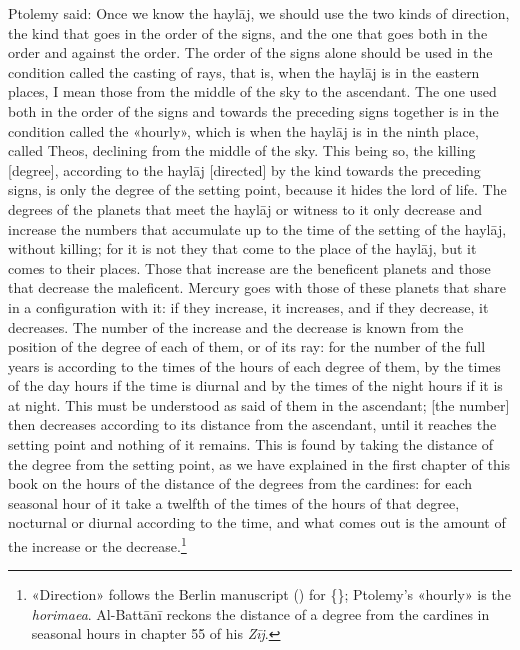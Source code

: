 \documentclass[11pt]{article}
\newcommand{\Fol}[1]{\marginpar{\footnotesize\color{gray}f.\,#1}}
\begin{document}
\par \Fol{47r}\Fol{47v}Ptolemy said: Once we know the haylāj, we should use the two kinds of direction, the kind that goes in the order of the signs, and the one that goes both in the order and against the order. The order of the signs alone should be used in the condition called the casting of rays, that is, when the haylāj is in the eastern places, I mean those from the middle of the sky to the ascendant. The one used both in the order of the signs and towards the preceding signs together is in the condition called the «hourly», which is when the haylāj is in the ninth place, called Theos, declining from the middle of the sky. This being so, the killing [degree], according to the haylāj [directed] by the kind towards the preceding signs, is only the degree of the setting point, because it hides the lord of life. The degrees of the planets that meet the haylāj or witness to it only decrease and increase the numbers that accumulate up to the time of the setting of the haylāj, without killing; for it is not they that come to the place of the haylāj, but it comes to their places. Those that increase are the beneficent planets and those that decrease the maleficent. Mercury goes with those of these planets that share in a configuration with it: if they increase, it increases, and if they decrease, it decreases. The number of the increase and the decrease is known from the position of the degree of each of them, or of its ray: for the number of the full years is according to the times of the hours of each degree of them, by the times of the day hours if the time is diurnal and by the times of the night hours if it is at night. This must be understood as said of them in the ascendant; [the number] then decreases according to its distance from the ascendant, until it reaches the setting point and nothing of it remains. This is found by taking the distance of the degree from the setting point, as we have explained in the first chapter of this book on the hours of the distance of the degrees from the cardines: for each seasonal hour of it take a twelfth of the times of the hours of that degree, nocturnal or diurnal according to the time, and what comes out is the amount of the increase or the decrease.\footnote{«Direction» follows the Berlin manuscript () for \{\}; Ptolemy's «hourly» is the \emph{horimaea}. Al-Battānī reckons the distance of a degree from the cardines in seasonal hours in chapter 55 of his \emph{Zīj}.}\par
\end{document}

